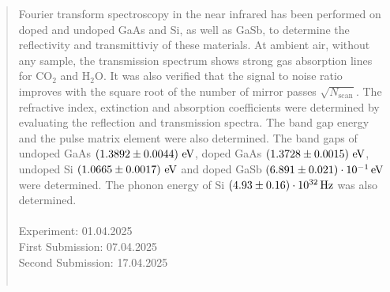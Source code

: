 \begin{abstract}                                                %
    \noindent Fourier transform spectroscopy in the near infrared has been performed on doped and undoped GaAs and Si,
     as well as GaSb, to determine the reflectivity and transmittiviy of these materials. 
     At ambient air, without any sample, the transmission spectrum shows strong gas absorption 
     lines for $\text{CO}_2$ and $\text{H}_2\text{O}$. 
     It was also verified that the signal to noise ratio improves with the square root of the number of mirror passes $\sqrt{N_\text{scan}}$.
    The refractive index, extinction and absorption coefficients were determined by evaluating the reflection and transmission spectra.
    The band gap energy and the pulse matrix element were also determined. The band gaps of undoped GaAs $\bandgapGaAsUndoped$, 
    doped GaAs $\bandgapGaAsDoped$, undoped Si $\bandgapSiUndoped$ and doped GaSb $\bandgapGaSbDoped$ were determined. 
    The phonon energy of Si $\OMEGASiUndoped$ was also determined.
    \\
    \\ 
    Experiment: 01.04.2025\\       %
    First Submission: 07.04.2025 \\
    Second Submission: 17.04.2025                %
    \\ 
    \\ 
\end{abstract}